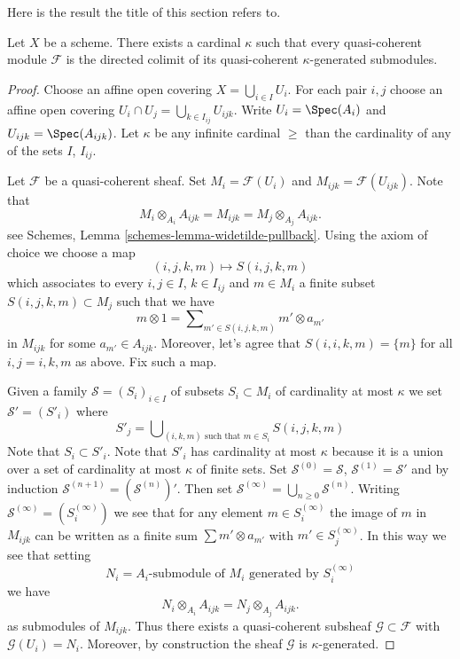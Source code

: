 \noindent
Here is the result the title of this section refers to.

\begin{lemma}
\label{lemma-colimit-kappa}
Let $X$ be a scheme. There exists a cardinal $\kappa$ such that
every quasi-coherent module $\mathcal{F}$ is the directed colimit
of its quasi-coherent $\kappa$-generated submodules.
\end{lemma}

\begin{proof}
Choose an affine open covering $X = \bigcup_{i \in I} U_i$. For each pair
$i, j$ choose an affine open covering
$U_i \cap U_j = \bigcup_{k \in I_{ij}} U_{ijk}$.
Write $U_i = \Spec(A_i)$ and $U_{ijk} = \Spec(A_{ijk})$.
Let $\kappa$ be any infinite cardinal $\geq$ than the cardinality
of any of the sets $I$, $I_{ij}$.

\medskip\noindent
Let $\mathcal{F}$ be a quasi-coherent sheaf. Set $M_i = \mathcal{F}(U_i)$
and $M_{ijk} = \mathcal{F}(U_{ijk})$. Note that
$$
M_i \otimes_{A_i} A_{ijk} = M_{ijk} = M_j \otimes_{A_j} A_{ijk}.
$$
see
Schemes, Lemma \ref{schemes-lemma-widetilde-pullback}.
Using the axiom of choice we choose a map
$$
(i, j, k, m) \mapsto S(i, j, k, m)
$$
which associates to every $i, j \in I$, $k \in I_{ij}$ and $m \in M_i$
a finite subset $S(i, j, k, m) \subset M_j$ such that we have
$$
m \otimes 1 = \sum\nolimits_{m' \in S(i, j, k, m)} m' \otimes a_{m'}
$$
in $M_{ijk}$ for some $a_{m'} \in A_{ijk}$. Moreover, let's agree
that $S(i, i, k, m) = \{m\}$ for all $i, j = i, k, m$ as above.
Fix such a map.

\medskip\noindent
Given a family $\mathcal{S} = (S_i)_{i \in I}$ of subsets
$S_i \subset M_i$ of cardinality at most $\kappa$ we set
$\mathcal{S}' = (S'_i)$ where
$$
S'_j = \bigcup\nolimits_{(i, k, m)\text{ such that }m \in S_i}
S(i, j, k, m)
$$
Note that $S_i \subset S'_i$. Note that $S'_i$ has cardinality at most
$\kappa$ because it is a union over a set of cardinality at most $\kappa$
of finite sets. Set $\mathcal{S}^{(0)} = \mathcal{S}$,
$\mathcal{S}^{(1)} = \mathcal{S}'$ and by induction
$\mathcal{S}^{(n + 1)} = (\mathcal{S}^{(n)})'$. Then set
$\mathcal{S}^{(\infty)} = \bigcup_{n \geq 0} \mathcal{S}^{(n)}$.
Writing $\mathcal{S}^{(\infty)} = (S^{(\infty)}_i)$ we see that
for any element $m \in S^{(\infty)}_i$ the image of $m$ in
$M_{ijk}$ can be written as a finite sum $\sum m' \otimes a_{m'}$
with $m' \in S_j^{(\infty)}$. In this way we see that setting
$$
N_i = A_i\text{-submodule of }M_i\text{ generated by }S^{(\infty)}_i
$$
we have
$$
N_i \otimes_{A_i} A_{ijk} = N_j \otimes_{A_j} A_{ijk}.
$$
as submodules of $M_{ijk}$. Thus there exists a quasi-coherent subsheaf
$\mathcal{G} \subset \mathcal{F}$ with $\mathcal{G}(U_i) = N_i$.
Moreover, by construction the sheaf $\mathcal{G}$ is $\kappa$-generated.


\end{proof}
